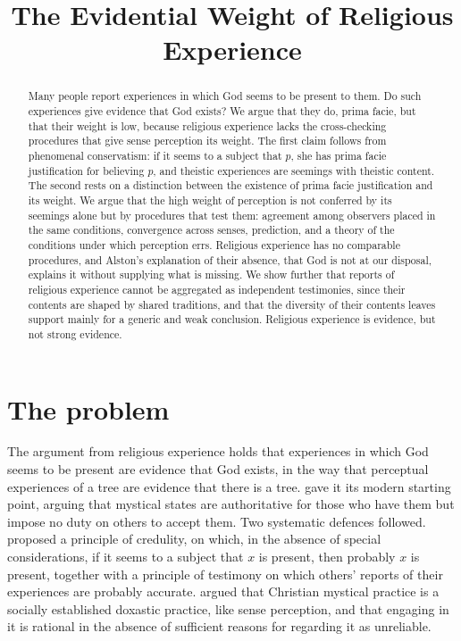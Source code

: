 \documentclass{situationist-preprint}
\title{The Evidential Weight of Religious Experience}
\begin{document}
\maketitle

\begin{abstract}
Many people report experiences in which God seems to be present to them. Do such experiences give evidence that God exists? We argue that they do, prima facie, but that their weight is low, because religious experience lacks the cross-checking procedures that give sense perception its weight. The first claim follows from phenomenal conservatism: if it seems to a subject that $p$, she has prima facie justification for believing $p$, and theistic experiences are seemings with theistic content. The second rests on a distinction between the existence of prima facie justification and its weight. We argue that the high weight of perception is not conferred by its seemings alone but by procedures that test them: agreement among observers placed in the same conditions, convergence across senses, prediction, and a theory of the conditions under which perception errs. Religious experience has no comparable procedures, and Alston's explanation of their absence, that God is not at our disposal, explains it without supplying what is missing. We show further that reports of religious experience cannot be aggregated as independent testimonies, since their contents are shaped by shared traditions, and that the diversity of their contents leaves support mainly for a generic and weak conclusion. Religious experience is evidence, but not strong evidence.
\end{abstract}

\section{The problem}

The argument from religious experience holds that experiences in which God seems to be present are evidence that God exists, in the way that perceptual experiences of a tree are evidence that there is a tree. \citet{James1902} gave it its modern starting point, arguing that mystical states are authoritative for those who have them but impose no duty on others to accept them. Two systematic defences followed. \citet{Swinburne1979} proposed a principle of credulity, on which, in the absence of special considerations, if it seems to a subject that $x$ is present, then probably $x$ is present, together with a principle of testimony on which others' reports of their experiences are probably accurate. \citet{Alston1991} argued that Christian mystical practice is a socially established doxastic practice, like sense perception, and that engaging in it is rational in the absence of sufficient reasons for regarding it as unreliable.
\end{document}
